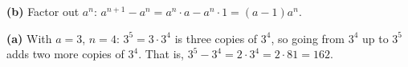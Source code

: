 \textbf{(b)} Factor out $a^n$: $a^{n+1}-a^n=a^n\cdot a-a^n\cdot1=(a-1)a^n$.

\textbf{(a)} With $a=3$, $n=4$: $3^5=3\cdot3^4$ is three copies of $3^4$, so going from $3^4$ up to $3^5$ adds two more copies of $3^4$. That is, $3^5-3^4=2\cdot3^4=2\cdot81=\boxed{162}$.
